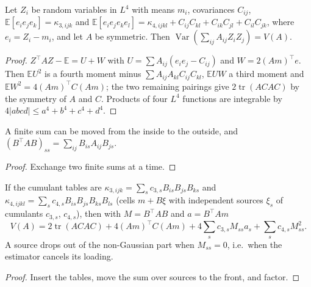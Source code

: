 \begin{theorem}\label{thm:variance_quad_of_cumulants}
  \leanok
  Let $Z_i$ be random variables in $L^4$ with means $m_i$, covariances $C_{ij}$,
  $\mathbb E[e_ie_je_k] = \kappa_{3,ijk}$ and
  $\mathbb E[e_ie_je_ke_l] = \kappa_{4,ijkl} + C_{ij}C_{kl} + C_{ik}C_{jl} + C_{il}C_{jk}$,
  where $e_i = Z_i - m_i$, and let $A$ be symmetric. Then
  $\operatorname{Var}(\sum_{ij} A_{ij}Z_iZ_j) = V(A)$.
\end{theorem}
\begin{proof}
  \leanok
  $Z^\top AZ - \mathbb E = U + W$ with $U = \sum A_{ij}(e_ie_j - C_{ij})$ and
  $W = 2(Am)^\top e$. Then $\mathbb E U^2$ is a fourth moment minus $\sum A_{ij}A_{kl}C_{ij}C_{kl}$,
  $\mathbb E UW$ a third moment and $\mathbb E W^2 = 4(Am)^\top C(Am)$; the two remaining pairings
  give $2\operatorname{tr}(ACAC)$ by the symmetry of $A$ and $C$. Products of four $L^4$ functions are
  integrable by $4|abcd| \le a^4 + b^4 + c^4 + d^4$.
\end{proof}

\begin{lemma}\label{lem:cumulants_sums}
  \leanok
  A finite sum can be moved from the inside to the outside, and
  $(B^\top AB)_{ss} = \sum_{ij} B_{is}A_{ij}B_{js}$.
\end{lemma}
\begin{proof}
  \leanok
  Exchange two finite sums at a time.
\end{proof}

\begin{theorem}\label{thm:varQuad_sources}
  \leanok
  If the cumulant tables are $\kappa_{3,ijk} = \sum_s c_{3,s}B_{is}B_{js}B_{ks}$ and
  $\kappa_{4,ijkl} = \sum_s c_{4,s}B_{is}B_{js}B_{ks}B_{ls}$ (cells $m + B\xi$ with independent
  sources $\xi_s$ of cumulants $c_{3,s}$, $c_{4,s}$), then with $M = B^\top AB$ and $a = B^\top Am$
  \[ V(A) = 2\operatorname{tr}(ACAC) + 4(Am)^\top C(Am) + 4\sum_s c_{3,s}M_{ss}a_s + \sum_s c_{4,s}M_{ss}^2. \]
  A source drops out of the non-Gaussian part when $M_{ss} = 0$, i.e.\ when the estimator cancels
  its loading.
\end{theorem}
\begin{proof}
  \leanok
  Insert the tables, move the sum over sources to the front, and factor.
\end{proof}


